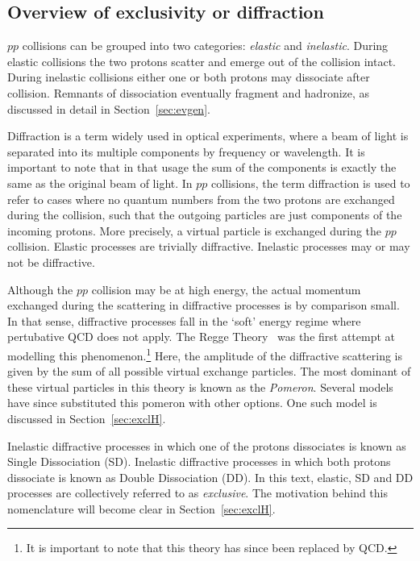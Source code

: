 \subsection{Overview of exclusivity or diffraction}
\par $pp$ collisions can be grouped into two categories: {\it elastic} and {\it inelastic}. 
During elastic collisions the two protons scatter and emerge out of the collision intact. 
During inelastic collisions either one or both protons may dissociate after collision. Remnants of 
dissociation eventually fragment and hadronize, as discussed in detail in Section~\ref{sec:evgen}. 

\par Diffraction is a term widely used in optical experiments, where a beam of light is separated into 
its multiple components by frequency or wavelength. It is important to note that in that usage the sum of 
the components is exactly the same as the original beam of light. In $pp$ collisions, the term diffraction is 
used to refer to cases where no quantum numbers from the two protons are exchanged during the collision, 
such that the outgoing particles are just components of the incoming protons. 
More precisely, a virtual particle is exchanged during the $pp$ collision.
Elastic processes are trivially diffractive. Inelastic processes 
may or may not be diffractive.

\par Although the $pp$ collision may be at high energy, the actual momentum exchanged during the scattering 
in diffractive processes is by comparison small. In that sense, diffractive processes fall in the `soft' 
energy regime where pertubative QCD does not apply. The Regge Theory~\cite{Costa:2012cb} was the first attempt 
at modelling this phenomenon.\footnote{It is important to note that this theory has since been replaced by QCD.}
Here, the amplitude of the diffractive scattering is given by the sum of all possible virtual exchange particles. 
The most dominant of these virtual particles in this theory is known as the {\it Pomeron}. Several models have 
since substituted this pomeron with other options. One such model is discussed in Section~\ref{sec:exclH}.

\par Inelastic diffractive processes in which one of the protons dissociates is known as Single Dissociation (SD). 
Inelastic diffractive processes in which both protons dissociate is known as Double Dissociation (DD). In this text, 
elastic, SD and DD processes are collectively referred to as {\it exclusive}. The motivation behind this 
nomenclature will become clear in Section~\ref{sec:exclH}. 

